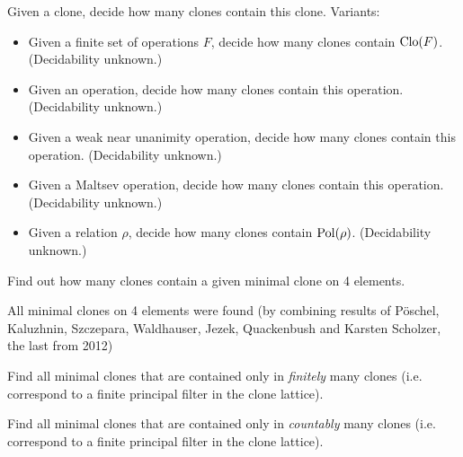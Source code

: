 \begin{question}
  Given a clone, decide how many clones contain this clone. Variants:
\begin{itemize}
    \item Given a finite set of operations $F$, decide how many clones contain
      $\operatorname{Clo}(F)$. (Decidability unknown.)
    \item Given an operation, decide how many clones contain this operation.
      (Decidability unknown.)
    \item Given a weak near unanimity operation, decide how many clones contain this operation.
      (Decidability unknown.)
    \item Given a Maltsev operation, decide how many clones contain this operation.
      (Decidability unknown.)
    \item Given a relation $\rho$, decide how many clones contain $\operatorname{Pol}(\rho)$.
      (Decidability unknown.)
  \end{itemize}
\end{question}

\begin{question}
  Find out how many clones contain a given minimal clone on 4 elements.
\end{question}
\begin{context}
All minimal clones on 4 elements were found (by combining results of 
P\"oschel, Kaluzhnin, Szczepara, Waldhauser, Jezek, Quackenbush and Karsten
Scholzer, the last from 2012)
\end{context}
\begin{question}
  Find all minimal clones that are contained only in \emph{finitely} many clones (i.e.
  correspond to a finite principal filter in the clone lattice).
\end{question}

\begin{question}
  Find all minimal clones that are contained only in \emph{countably} many clones (i.e.
  correspond to a finite principal filter in the clone lattice).
\end{question}

